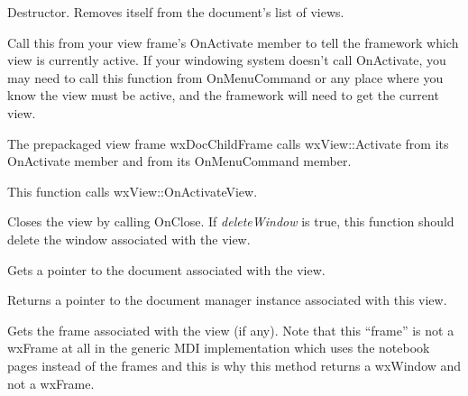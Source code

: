 
Destructor. Removes itself from the document's list of views.

\label{wxviewactivate}


Call this from your view frame's OnActivate member to tell the framework which view is
currently active. If your windowing system doesn't call OnActivate, you may need to
call this function from OnMenuCommand or any place where you know the view must
be active, and the framework will need to get the current view.

The prepackaged view frame wxDocChildFrame calls wxView::Activate from its OnActivate member
and from its OnMenuCommand member.

This function calls wxView::OnActivateView.

\label{wxviewclose}


Closes the view by calling OnClose. If {\it deleteWindow} is true, this function should
delete the window associated with the view.

\label{wxviewgetdocument}


Gets a pointer to the document associated with the view.

\label{wxviewgetdocumentmanager}


Returns a pointer to the document manager instance associated with this view.

\label{wxviewgetframe}


Gets the frame associated with the view (if any). Note that this ``frame'' is
not a wxFrame at all in the generic MDI implementation which uses the notebook
pages instead of the frames and this is why this method returns a wxWindow and
not a wxFrame.

\label{wxviewgetviewname}


